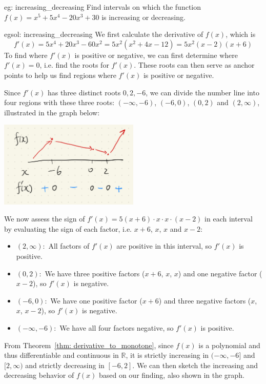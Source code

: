 \begin{eg}[]{eg: increasing_decreasing}
    Find intervals on which the function $f(x) = x^5 + 5x^4 - 20x^3 + 30$ is increasing or decreasing.
\end{eg}

\begin{egsol}[]{egsol: increasing_decreasing}
    We first calculate the derivative of $f(x)$, which is
    \[f'(x) = 5x^4 + 20x^3 - 60x^2 = 5x^2(x^2+4x-12) = 5x^2(x-2)(x+6)\]
    To find where $f'(x)$ is positive or negative, we can first determine where $f'(x) = 0$, i.e. find the roots for $f'(x)$.  These roots can then serve as anchor points to help us find regions where $f'(x)$ is positive or negative.
    
    Since $f'(x)$ has three distinct roots $0, 2, -6$, we can divide the number line into four regions with these three roots: $(-\infty, -6)$, $(-6, 0)$, $(0, 2)$ and $(2, \infty)$, illustrated in the graph below: 
    \begin{center}
        \includegraphics[width = 0.5\textwidth]{figures/chap 05/eg_increasing_decreasing.png}
        \label{fig: eg_increasing_decreasing}
    \end{center}
    We now assess the sign of $f'(x) = 5 (x+6) \cdot x \cdot x \cdot (x-2)$ in each interval by evaluating the sign of each factor, i.e. $x+6$, $x$, $x$ and $x-2$:
    \begin{itemize}
        \item $(2, \infty):$ All factors of $f'(x)$ are positive in this interval, so $f'(x)$ is positive.
        \item $(0, 2):$ We have three positive factors ($x+6$, $x$, $x$) and one negative factor ($x-2$), so $f'(x)$ is negative.
        \item $(-6, 0):$ We have one positive factor ($x+6$) and three negative factors ($x$, $x$, $x-2$), so $f'(x)$ is negative.
        \item $(-\infty, -6):$ We have all four factors negative, so $f'(x)$ is positive.
    \end{itemize}
    From Theorem~\ref{thm: derivative_to_monotone}, since $f(x)$ is a polynomial and thus differentiable and continuous in $\mathbb{R}$, it is strictly increasing in $(-\infty, -6]$ and $[2, \infty)$ and strictly decreasing in $[-6, 2]$.  We can then sketch the increasing and decreasing behavior of $f(x)$ based on our finding, also shown in the graph.
\end{egsol}

